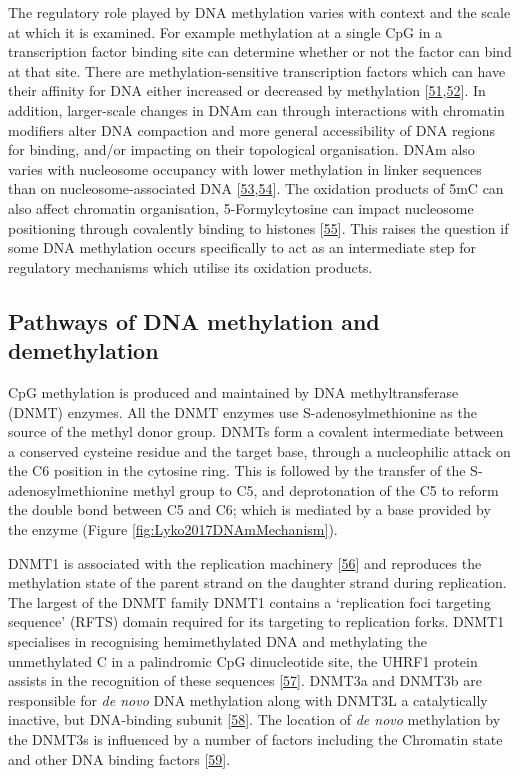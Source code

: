\documentclass[
]{book}
\begin{document}
The regulatory role played by DNA methylation varies with context and the scale at which it is examined.
For example methylation at a single CpG in a transcription factor binding site can determine whether or not the factor can bind at that site.
There are methylation-sensitive transcription factors which can have their affinity for DNA either increased or decreased by methylation {[}\protect\hyperlink{ref-Yin2017}{51},\protect\hyperlink{ref-Zuo2017}{52}{]}.
In addition, larger-scale changes in DNAm can through interactions with chromatin modifiers alter DNA compaction and more general accessibility of DNA regions for binding, and/or impacting on their topological organisation.
DNAm also varies with nucleosome occupancy with lower methylation in linker sequences than on nucleosome-associated DNA {[}\protect\hyperlink{ref-Kelly2012}{53},\protect\hyperlink{ref-Huff2014}{54}{]}.
The oxidation products of 5mC can also affect chromatin organisation, 5-Formylcytosine can impact nucleosome positioning through covalently binding to histones {[}\protect\hyperlink{ref-Raiber2017}{55}{]}.
This raises the question if some DNA methylation occurs specifically to act as an intermediate step for regulatory mechanisms which utilise its oxidation products.

\hypertarget{pathways-of-dna-methylation-and-demethylation}{%
\subsection{Pathways of DNA methylation and demethylation}\label{pathways-of-dna-methylation-and-demethylation}}

CpG methylation is produced and maintained by DNA methyltransferase (DNMT) enzymes.
All the DNMT enzymes use S-adenosylmethionine as the source of the methyl donor group.
DNMTs form a covalent intermediate between a conserved cysteine residue and the target base, through a nucleophilic attack on the C6 position in the cytosine ring.
This is followed by the transfer of the S-adenosylmethionine methyl group to C5, and deprotonation of the C5 to reform the double bond between C5 and C6; which is mediated by a base provided by the enzyme (Figure \ref{fig:Lyko2017DNAmMechanism}).

DNMT1 is associated with the replication machinery {[}\protect\hyperlink{ref-Vertino2002}{56}{]} and reproduces the methylation state of the parent strand on the daughter strand during replication.
The largest of the DNMT family DNMT1 contains a `replication foci targeting sequence' (RFTS) domain required for its targeting to replication forks.
DNMT1 specialises in recognising hemimethylated DNA and methylating the unmethylated C in a palindromic CpG dinucleotide site, the UHRF1 protein assists in the recognition of these sequences {[}\protect\hyperlink{ref-Bostick2007}{57}{]}.
DNMT3a and DNMT3b are responsible for \emph{de novo} DNA methylation along with DNMT3L a catalytically inactive, but DNA-binding subunit {[}\protect\hyperlink{ref-Jia2009}{58}{]}.
The location of \emph{de novo} methylation by the DNMT3s is influenced by a number of factors including the Chromatin state and other DNA binding factors {[}\protect\hyperlink{ref-Lyko2017}{59}{]}.
\end{document}
